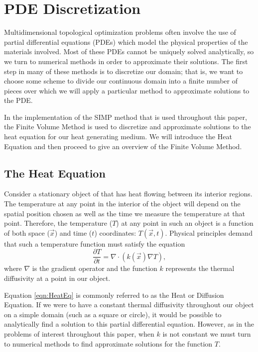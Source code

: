 \section{PDE Discretization}
Multidimensional topological optimization problems often involve the use of partial differential equations (PDEs) which model the physical properties of the materials involved. Most of these PDEs cannot be uniquely solved analytically, so we turn to numerical methods in order to approximate their solutions. The first step in many of these methods is to discretize our domain; that is, we want to choose some scheme to divide our continuous domain into a finite number of pieces over which we will apply a particular method to approximate solutions to the PDE.

In the implementation of the SIMP method that is used throughout this paper, the Finite Volume Method is used to discretize and approximate solutions to the heat equation for our heat generating medium. We will introduce the Heat Equation and then proceed to give an overview of the Finite Volume Method.
\subsection{The Heat Equation}
Consider a stationary object of that has heat flowing between its interior regions. The temperature at any point in the interior of the object will depend on the spatial position chosen as well as the time we measure the temperature at that point. Therefore, the temperature ($T$) at any point in such an object is a function of both space ($\vec{x}$) and time ($t$) coordinates: $T(\vec{x},t)$.
Physical principles demand that such a temperature function must satisfy the equation
\begin{equation}
	\frac{\partial T}{\partial t}=\nabla\cdot\left(k(\vec{x})\nabla T\right)\label{eqn:HeatEq},
\end{equation}
where $\nabla$ is the gradient operator and the function $k$ represents the thermal diffusivity at a point in our object.

Equation \eqref{eqn:HeatEq} is commonly referred to as the Heat or Diffusion Equation. If we were to have a constant thermal diffusivity throughout our object on a simple domain (such as a square or circle), it would be possible to analytically find a solution to this partial differential equation. However, as in the problems of interest throughout this paper, when $k$ is not constant we must turn to numerical methods to find approximate solutions for the function $T$.

